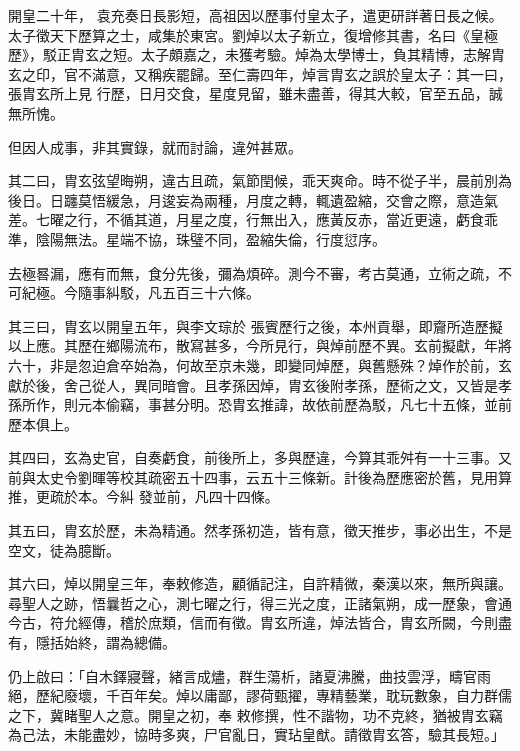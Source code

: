 
\begin{pinyinscope}

 開皇二十年，
 袁充奏日長影短，高祖因以歷事付皇太子，遣更研詳著日長之候。太子徵天下歷算之士，咸集於東宮。劉焯以太子新立，復增修其書，名曰《皇極歷》，駁正胄玄之短。太子頗嘉之，未獲考驗。焯為太學博士，負其精博，志解胄玄之印，官不滿意，又稱疾罷歸。至仁壽四年，焯言胄玄之誤於皇太子：其一曰，張胄玄所上見
 行歷，日月交食，星度見留，雖未盡善，得其大較，官至五品，誠無所愧。



 但因人成事，非其實錄，就而討論，違舛甚眾。



 其二曰，胄玄弦望晦朔，違古且疏，氣節閏候，乖天爽命。時不從子半，晨前別為後日。日躔莫悟緩急，月逡妄為兩種，月度之轉，輒遺盈縮，交會之際，意造氣差。七曜之行，不循其道，月星之度，行無出入，應黃反赤，當近更遠，虧食乖準，陰陽無法。星端不協，珠璧不同，盈縮失倫，行度愆序。



 去極晷漏，應有而無，食分先後，彌為煩碎。測今不審，考古莫通，立術之疏，不可紀極。今隨事糾駁，凡五百三十六條。



 其三曰，胄玄以開皇五年，與李文琮於
 張賓歷行之後，本州貢舉，即齎所造歷擬以上應。其歷在鄉陽流布，散寫甚多，今所見行，與焯前歷不異。玄前擬獻，年將六十，非是忽迫倉卒始為，何故至京未幾，即變同焯歷，與舊懸殊？焯作於前，玄獻於後，舍己從人，異同暗會。且孝孫因焯，胄玄後附孝孫，歷術之文，又皆是孝孫所作，則元本偷竊，事甚分明。恐胄玄推諱，故依前歷為駁，凡七十五條，並前歷本俱上。



 其四曰，玄為史官，自奏虧食，前後所上，多與歷違，今算其乖舛有一十三事。又前與太史令劉暉等校其疏密五十四事，云五十三條新。計後為歷應密於舊，見用算推，更疏於本。今糾
 發並前，凡四十四條。



 其五曰，胄玄於歷，未為精通。然孝孫初造，皆有意，徵天推步，事必出生，不是空文，徒為臆斷。



 其六曰，焯以開皇三年，奉敕修造，顧循記注，自許精微，秦漢以來，無所與讓。尋聖人之跡，悟曩哲之心，測七曜之行，得三光之度，正諸氣朔，成一歷象，會通今古，符允經傳，稽於庶類，信而有徵。胄玄所違，焯法皆合，胄玄所闕，今則盡有，隱括始終，謂為總備。



 仍上啟曰：「自木鐸寢聲，緒言成燼，群生蕩析，諸夏沸騰，曲技雲浮，疇官雨絕，歷紀廢壞，千百年矣。焯以庸鄙，謬荷甄擢，專精藝業，耽玩數象，自力群儒之下，冀睹聖人之意。開皇之初，奉
 敕修撰，性不諧物，功不克終，猶被胄玄竊為己法，未能盡妙，協時多爽，尸官亂日，實玷皇猷。請徵胄玄答，驗其長短。」




\end{pinyinscope}
